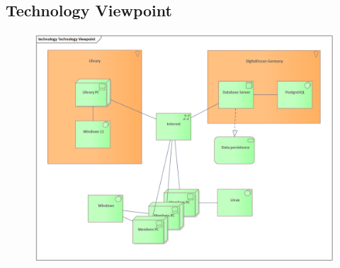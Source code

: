 \documentclass[11pt,twoside,a4paper]{article}
\begin{document}
\pagebreak
\subsection{Technology Viewpoint}
\begin{figure}[!ht]
    \includegraphics[scale=.8]{../ea/Technology Viewpoint.png}
    \centering
\end{figure}

\pagebreak
\end{document}
